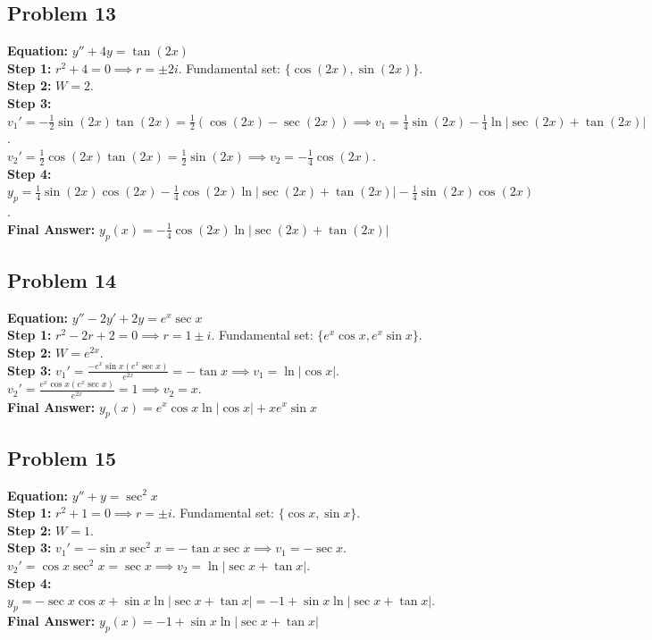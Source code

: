 \documentclass[11pt]{article}
\begin{document}
\subsection*{Problem 13}
\textbf{Equation:} $y'' + 4y = \tan(2x)$ \\
\textbf{Step 1:} $r^2 + 4 = 0 \implies r = \pm 2i$. Fundamental set: $\{\cos(2x), \sin(2x)\}$. \\
\textbf{Step 2:} $W = 2$. \\
\textbf{Step 3:} $v_1' = -\frac{1}{2}\sin(2x)\tan(2x) = \frac{1}{2}(\cos(2x) - \sec(2x)) \implies v_1 = \frac{1}{4}\sin(2x) - \frac{1}{4}\ln|\sec(2x) + \tan(2x)|$. \\
$v_2' = \frac{1}{2}\cos(2x)\tan(2x) = \frac{1}{2}\sin(2x) \implies v_2 = -\frac{1}{4}\cos(2x)$. \\
\textbf{Step 4:} $y_p = \frac{1}{4}\sin(2x)\cos(2x) - \frac{1}{4}\cos(2x)\ln|\sec(2x) + \tan(2x)| - \frac{1}{4}\sin(2x)\cos(2x)$. \\
\textbf{Final Answer:} $y_p(x) = -\frac{1}{4}\cos(2x)\ln|\sec(2x) + \tan(2x)|$

\subsection*{Problem 14}
\textbf{Equation:} $y'' - 2y' + 2y = e^x \sec x$ \\
\textbf{Step 1:} $r^2 - 2r + 2 = 0 \implies r = 1 \pm i$. Fundamental set: $\{e^x\cos x, e^x\sin x\}$. \\
\textbf{Step 2:} $W = e^{2x}$. \\
\textbf{Step 3:} $v_1' = \frac{-e^x\sin x(e^x\sec x)}{e^{2x}} = -\tan x \implies v_1 = \ln|\cos x|$. \\
$v_2' = \frac{e^x\cos x(e^x\sec x)}{e^{2x}} = 1 \implies v_2 = x$. \\
\textbf{Final Answer:} $y_p(x) = e^x\cos x\ln|\cos x| + xe^x\sin x$

\subsection*{Problem 15}
\textbf{Equation:} $y'' + y = \sec^2 x$ \\
\textbf{Step 1:} $r^2 + 1 = 0 \implies r = \pm i$. Fundamental set: $\{\cos x, \sin x\}$. \\
\textbf{Step 2:} $W = 1$. \\
\textbf{Step 3:} $v_1' = -\sin x \sec^2 x = -\tan x \sec x \implies v_1 = -\sec x$. \\
$v_2' = \cos x \sec^2 x = \sec x \implies v_2 = \ln|\sec x + \tan x|$. \\
\textbf{Step 4:} $y_p = -\sec x \cos x + \sin x \ln|\sec x + \tan x| = -1 + \sin x \ln|\sec x + \tan x|$. \\
\textbf{Final Answer:} $y_p(x) = -1 + \sin x \ln|\sec x + \tan x|$
\end{document}
